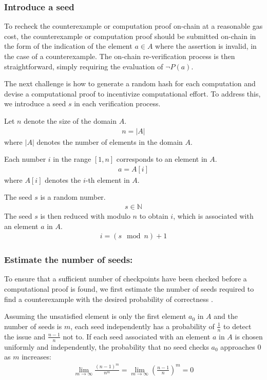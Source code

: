 \documentclass[runningheads]{llncs}
\begin{document}
\subsubsection{Introduce a seed} To recheck the counterexample or computation proof on-chain at a reasonable gas cost, the counterexample or computation proof should be submitted on-chain in the form of the indication of the element \( a \in A \) where the assertion is invalid, in the case of a counterexample. The on-chain re-verification process is then straightforward, simply requiring the evaluation of \( \neg P(a) \).

The next challenge is how to generate a random hash for each computation and devise a computational proof to incentivize computational effort. To address this, we introduce a seed \( s \) in each verification process.

Let \( n \) denote the size of the domain \( A \). 
\begin{gather*}
n = |A|
\end{gather*}
where \(|A| \) denotes the number of elements in the domain $A$.

Each number \( i \) in the range \([1, n]\) corresponds to an element in \( A \). 
\begin{gather*}
a=A[i]
\end{gather*}
where $A[i]$ denotes the $i$-th element in $A$.

The seed \( s \) is a random number. 
\begin{gather*}
s \in \mathbb{N} 
\end{gather*}
The seed $s$  is then reduced with modulo \( n \) to obtain \( i \), which is associated with an element \( a \) in \( A \).
\begin{gather}
\label{eq:11}
i = (s\mod n) + 1
\end{gather}
\subsubsection{Estimate the number of seeds:} To ensure that a sufficient number of checkpoints have been checked before a computational proof is found, we first estimate the number of seeds required to find a counterexample with the desired probability of correctness \cite{ross2014probability,feller1968probability}.

Assuming the unsatisfied element is only the first element \( a_0 \) in \( A \) and the number of seeds is \( m \), each seed independently has a probability of \( \frac{1}{n} \) to detect the issue and \( \frac{n-1}{n} \) not to. If each seed associated with an element \( a \) in \( A \) is chosen uniformly and independently, the probability that no seed checks \( a_0 \) approaches 0 as \( m \) increases:
\begin{gather*}
\lim_{m \to \infty} \frac{(n-1)^m}{n^m} = \lim_{m \to \infty} \left( \frac{n-1}{n} \right)^m = 0
\end{gather*}
\end{document}
